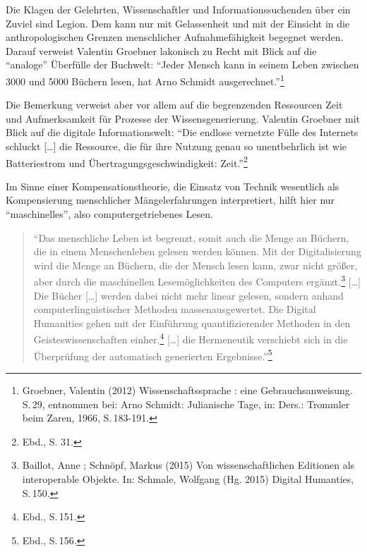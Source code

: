 \documentclass[a4paper,
fontsize=11pt,
oneside,
numbers=noperiodatend,
parskip=half-,
bibliography=totoc,
final
]{scrartcl}
\begin{document}
Die Klagen der Gelehrten, Wissenschaftler und Informationssuchenden über
ein Zuviel sind Legion. Dem kann nur mit Gelassenheit und mit der
Einsicht in die anthropologischen Grenzen menschlicher Aufnahmefähigkeit
begegnet werden. Darauf verweist Valentin Groebner lakonisch zu Recht
mit Blick auf die \enquote{analoge} Überfülle der Buchwelt:
\enquote{Jeder Mensch kann in seinem Leben zwischen 3000 und 5000
Büchern lesen, hat Arno Schmidt ausgerechnet.}\footnote{Groebner,
  Valentin (2012) Wissenschaftssprache : eine Gebrauchsanweisung. S.\,29,
  entnommen bei: Arno Schmidt: Julianische Tage, in: Ders.: Trommler
  beim Zaren, 1966, S.\,183-191.}

Die Bemerkung verweist aber vor allem auf die begrenzenden Ressourcen
Zeit und Aufmerksamkeit für Prozesse der Wissensgenerierung. Valentin
Groebner mit Blick auf die digitale Informationswelt: \enquote{Die
endlose vernetzte Fülle des Internets schluckt {[}\ldots{}{]} die
Ressource, die für ihre Nutzung genau so unentbehrlich ist wie
Batteriestrom und Übertragungsgeschwindigkeit: Zeit.}\footnote{Ebd., S.
  31.}

Im Sinne einer Kompensationstheorie, die Einsatz von Technik wesentlich
als Kompensierung menschlicher Mängelerfahrungen interpretiert, hilft
hier nur \enquote{maschinelles}, also computergetriebenes Lesen.

\begin{quote}
\enquote{Das menschliche Leben ist begrenzt, somit auch die Menge an
Büchern, die in einem Menschenleben gelesen werden können. Mit der
Digitalisierung wird die Menge an Büchern, die der Mensch lesen kann,
zwar nicht größer, aber durch die maschinellen Lesemöglichkeiten des
Computers ergänzt.\footnote{Baillot, Anne ; Schnöpf, Markus (2015) Von
  wissenschaftlichen Editionen als interoperable Objekte. In: Schmale,
  Wolfgang (Hg. 2015) Digital Humanties, S.\,150.} {[}\ldots{}{]} Die
Bücher {[}\ldots{}{]} werden dabei nicht mehr linear gelesen, sondern
anhand computerlinguistischer Methoden massenausgewertet. Die Digital
Humanities gehen mit der Einführung quantifizierender Methoden in den
Geisteswissenschaften einher.\footnote{Ebd., S.\,151.} {[}\ldots{}{]} die
Hermeneutik verschiebt sich in die Überprüfung der automatisch
generierten Ergebnisse.}\footnote{Ebd., S.\,156.}
\end{quote}
\end{document}
